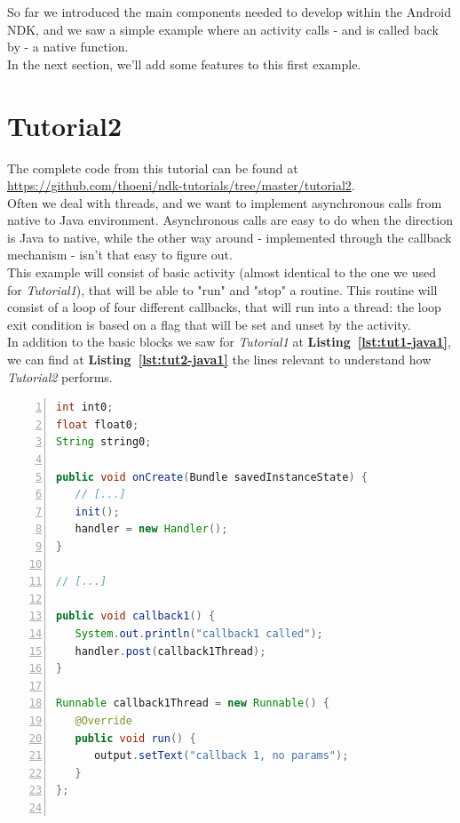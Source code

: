\documentclass[a4paper,10pt]{article}
\newcommand{\refl}[1]{\textbf{Listing~\ref{#1}}}
\begin{document}
\begin{multicols}{2}
So far we introduced the main components needed to develop within the Android NDK, and we saw a simple example where an activity calls - and is called back by - a native function.\\
In the next section, we'll add some features to this first example.


\section{Tutorial2}
\label{sec:tutorial2}
The complete code from this tutorial can be found at \url{https://github.com/thoeni/ndk-tutorials/tree/master/tutorial2}.\\
Often we deal with threads, and we want to implement asynchronous calls from native to Java environment. Asynchronous calls are easy to do when the direction is Java to native, while the other way around - implemented through the callback mechanism - isn't that easy to figure out.\\
This example will consist of basic activity (almost identical to the one we used for \textit{Tutorial1}), that will be able to "run" and "stop" a routine. This routine will consist of a loop of four different callbacks, that will run into a thread: the loop exit condition is based on a flag that will be set and unset by the activity.\\
In addition to the basic blocks we saw for \textit{Tutorial1} at \refl{lst:tut1-java1}, we can find at \refl{lst:tut2-java1} the lines relevant to understand how \textit{Tutorial2} performs.
\begin{lstlisting}[language=Java,
				   columns=fullflexible,
				   showstringspaces=false,
				   xleftmargin=15pt,
				   frame = l,
				   numbers=left,
				   commentstyle=\color{gray}\upshape,
				   caption=Part of Tutorial2Activity.java source code,
				   label=lst:tut2-java1]
int int0;
float float0;
String string0;

public void onCreate(Bundle savedInstanceState) {
   // [...]
   init();
   handler = new Handler();
}

// [...]

public void callback1() {
   System.out.println("callback1 called");
   handler.post(callback1Thread);
}

Runnable callback1Thread = new Runnable() {
   @Override
   public void run() {
      output.setText("callback 1, no params");
   }
};


\end{lstlisting}
\end{multicols}
\end{document}
